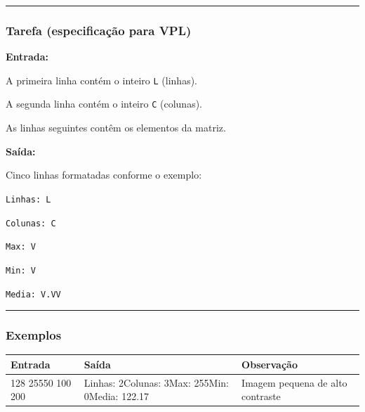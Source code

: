 \documentclass[
  portuguese,
  letterpaper,
  openany,
  oneside,
  12pt,
  a4paper]{book}
\begin{document}
\begin{center}\rule{0.5\linewidth}{0.5pt}\end{center}

\subsubsection{\texorpdfstring{ Tarefa (especificação
para
VPL)}{ Tarefa (especificação para VPL)}}\label{tarefa-especificauxe7uxe3o-para-vpl-1}

\textbf{Entrada:}

A primeira linha contém o inteiro \texttt{L} (linhas).

A segunda linha contém o inteiro \texttt{C} (colunas).

As linhas seguintes contêm os elementos da matriz.

\textbf{Saída:}

Cinco linhas formatadas conforme o exemplo:

\texttt{Linhas:\ L}

\texttt{Colunas:\ C}

\texttt{Max:\ V}

\texttt{Min:\ V}

\texttt{Media:\ V.VV}

\begin{center}\rule{0.5\linewidth}{0.5pt}\end{center}

\subsubsection{\texorpdfstring{
Exemplos}{ Exemplos}}\label{exemplos-1}

\begin{longtable}[]{@{}
  >{\raggedright\arraybackslash}p{}
  >{\raggedright\arraybackslash}p{}
  >{\raggedright\arraybackslash}p{}@{}}
\toprule\noalign{}
\begin{minipage}[b]{\linewidth}\raggedright
Entrada
\end{minipage} & \begin{minipage}[b]{\linewidth}\raggedright
Saída
\end{minipage} & \begin{minipage}[b]{\linewidth}\raggedright
Observação
\end{minipage} \\
\midrule\noalign{}
\endhead
\bottomrule\noalign{}
\endlastfoot
230 128 25550 100 200 & Linhas: 2Colunas: 3Max: 255Min: 0Media: 122.17 &
Imagem pequena de alto contraste \\
\end{longtable}
\end{document}
